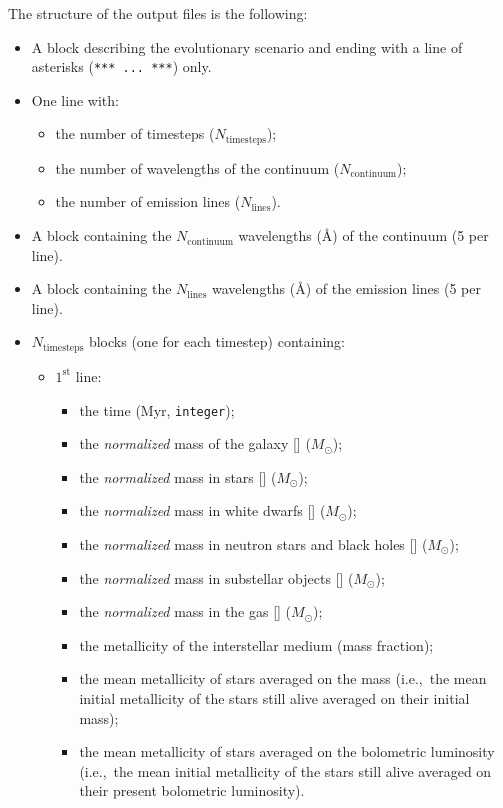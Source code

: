 \documentclass[11pt,draft,fleqn]{article}
\begin{document}
The structure of the output files is the following:
\begin{itemize}
\item A block describing the evolutionary scenario and ending with a
line of asterisks (\texttt{*** ... ***}) only.
\item One line with:
\begin{itemize}
\item the number of timesteps ($N_{\mathrm{timesteps}}$);
\item the number of wavelengths of the continuum ($N_{\mathrm{continuum}}$);
\item the number of emission lines ($N_{\mathrm{lines}}$).
\end{itemize}
\item A block containing the $N_{\mathrm{continuum}}$
wavelengths (\AA) of the continuum (5 per line).
\item A block containing the $N_{\mathrm{lines}}$ wavelengths (\AA) of the emission lines (5 per line).
\item $N_{\mathrm{timesteps}}$ blocks (one for each timestep) containing:
\begin{itemize}
\item $1^{\mathrm{st}}$ line:
\begin{itemize}
\item the time (Myr, \texttt{integer});
\item the \emph{normalized} mass of the galaxy [\dag] ($M_{\odot}$);
\item the \emph{normalized} mass in stars [\dag] ($M_{\odot}$);
\item the \emph{normalized} mass in white dwarfs [\dag] ($M_{\odot}$);
\item the \emph{normalized} mass in neutron stars and black holes
[\dag] ($M_{\odot}$);
\item the \emph{normalized} mass in substellar objects [\dag] ($M_{\odot}$);
\item the \emph{normalized} mass in the gas [\dag] ($M_{\odot}$);
\item the metallicity of the interstellar medium (mass fraction);
\item the mean metallicity of stars averaged on the mass (i.e.,\ the mean initial 
metallicity of the stars still alive averaged on their initial mass);
\item the mean metallicity of stars averaged on the bolometric luminosity (i.e.,\ 
the mean initial metallicity of the stars still alive averaged on their present
bolometric luminosity).

\end{itemize}
\end{itemize}
\end{itemize}
\end{document}
